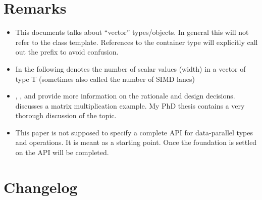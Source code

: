 \section{Remarks}
\begin{itemize}
  \item This documents talks about “vector” types/objects.
    In general this will not refer to the \std{} class template.
    References to the container type will explicitly call out the  prefix to avoid confusion.
  \item In the following  denotes the number of scalar values (width) in a vector of type \type T (sometimes also called the number of SIMD lanes)
  \item \citep{N4184}, \citep{N4185}, and \citep{N4395} provide more information on the rationale and design decisions.
    \citep{N4454} discusses a matrix multiplication example.
    My PhD thesis \citep{Kretz2015} contains a very thorough discussion of the topic.
  \item This paper is not supposed to specify a complete API for data-parallel types and operations.
    It is meant as a starting point.
    Once the foundation is settled on the API will be completed.
\end{itemize}

\section{Changelog}
